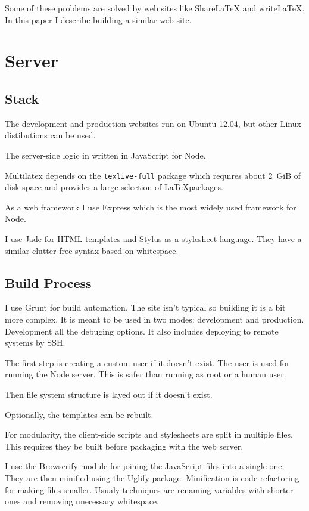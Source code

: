 \documentclass{llncs}
\begin{document}
Some of these problems are solved by web sites like \mbox{ShareLaTeX} and \mbox{writeLaTeX}. In this paper I describe building a similar web site.

\section{Server}

\subsection{Stack}

The development and production websites run on Ubuntu 12.04, but other Linux distibutions can be used.

The server-side logic in written in JavaScript for Node.

Multilatex depends on the \texttt{texlive-full} package which requires about 2~GiB of disk space and provides a large selection of \LaTeX packages.

As a web framework I use Express which is the most widely used framework for Node.

I use Jade for HTML templates and Stylus as a stylesheet language. They have a similar clutter-free syntax based on whitespace.

\subsection {Build Process}

I use Grunt for build automation. The site isn't typical so building it is a bit more complex. It is meant to be used in two modes: development and production. Development all the debuging options. It also includes deploying to remote systems by SSH.

The first step is creating a custom user if it doesn't exist. The user is used for running the Node server. This is safer than running as root or a human user.

Then file system structure is layed out if it doesn't exist.

Optionally, the templates can be rebuilt.

For modularity, the client-side scripts and stylesheets are split in multiple files. This requires they be built before packaging with the web server.

I use the Browserify module for joining the JavaScript files into a single one. They are then minified using the Uglify package. Minification is code refactoring for making files smaller. Usualy techniques are renaming variables with shorter ones and removing unecessary whitespace.
\end{document}
